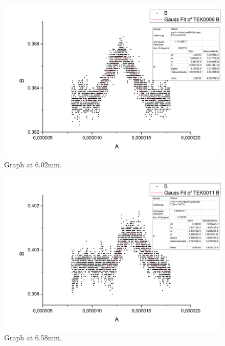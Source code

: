 \begin{figure}[h]
\begin{center}
\includegraphics[scale=0.25]{Bilder/Teil2/Graph9}
\caption{Graph at 6.02mm.}
\label{fig:graph9}
\end{center}
\end{figure}
\begin{figure}[h]
\begin{center}
\includegraphics[scale=0.25]{Bilder/Teil2/Graph10}
\caption{Graph at 6.58mm.}
\label{fig:graph10}
\end{center}
\end{figure}
